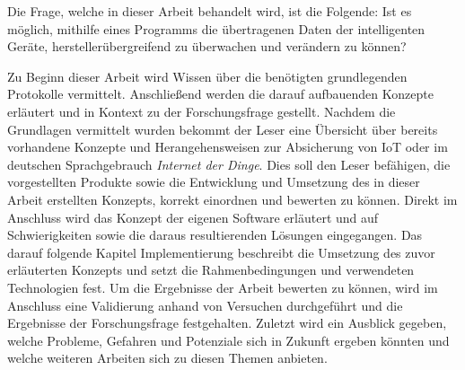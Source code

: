     Die Frage, welche in dieser Arbeit behandelt wird, ist die Folgende: 
    Ist es möglich, mithilfe eines Programms die übertragenen Daten der intelligenten Geräte, herstellerübergreifend zu überwachen und verändern zu können?

    Zu Beginn dieser Arbeit wird Wissen über die benötigten grundlegenden Protokolle vermittelt.
    Anschließend werden die darauf aufbauenden Konzepte erläutert und in Kontext zu der Forschungsfrage gestellt.
    Nachdem die Grundlagen vermittelt wurden bekommt der Leser eine Übersicht über bereits vorhandene Konzepte und Herangehensweisen zur Absicherung von \ac{IoT} oder im deutschen Sprachgebrauch \emph{Internet der Dinge}. 
    Dies soll den Leser befähigen, die vorgestellten Produkte sowie die Entwicklung und Umsetzung des in dieser Arbeit erstellten Konzepts, korrekt einordnen und bewerten zu können.
    Direkt im Anschluss wird das Konzept der eigenen Software erläutert und auf Schwierigkeiten sowie die daraus resultierenden Lösungen eingegangen. Das darauf folgende Kapitel \glqq Implementierung\grqq{} beschreibt die Umsetzung des zuvor erläuterten Konzepts und setzt die Rahmenbedingungen und verwendeten Technologien fest. Um die Ergebnisse der Arbeit bewerten zu können, wird im Anschluss eine Validierung anhand von Versuchen durchgeführt und die Ergebnisse der Forschungsfrage festgehalten. Zuletzt wird ein Ausblick gegeben, welche Probleme, Gefahren und Potenziale sich in Zukunft ergeben könnten und welche weiteren Arbeiten sich zu diesen Themen anbieten.
